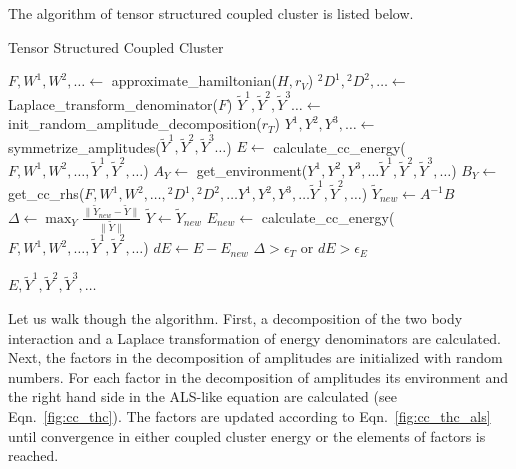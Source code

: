 The algorithm of tensor structured coupled cluster is listed below. 
%
\begin{algorithm}[H]
  \caption{Tensor Structured Coupled Cluster}\label{code:tcc_algorithm}
  \begin{algorithmic}[1] 
  \State $F, W^{1},W^{2},\ldots \gets$ approximate\_hamiltonian($H, r_{V}$)
  \State ${}^2D^1,{}^2D^{2},\ldots \gets$ 
Laplace\_transform\_denominator($F$)  
  \State $\tilde{Y}^1, \tilde{Y}^2, \tilde{Y}^3 \ldots \gets$ 
init\_random\_amplitude\_decomposition($r_{T}$) 
  \Repeat 
  \State $Y^1, Y^2, Y^3, \ldots \gets 
$ symmetrize\_amplitudes($\tilde{Y}^{1}, \tilde{Y}^{2}, \tilde{Y}^{3} \ldots$)
   \State $E \gets $ calculate\_cc\_energy($F, W^1, W^2, \ldots, 
\tilde{Y}^{1}, \tilde{Y}^{2}, \ldots$)
  \State $A_{Y} \gets $ get\_environment($Y^1, Y^2, Y^3, \ldots \tilde{Y}^1, 
\tilde{Y}^2, \tilde{Y}^3, \ldots$)
  \State $B_{Y} \gets $ get\_cc\_rhs($F, W^1, W^2, \ldots, {}^2D^{1}, 
{}^2D^{2}, \ldots Y^{1}, Y^{2}, Y^{3}, \ldots \tilde{Y}^{1}, \tilde{Y}^{2}, 
\ldots$) 
   \State $\tilde{Y}_{new} \gets A^{-1} B$
   \EndFor
   \State $\Delta \gets \max_{Y} \frac{\| \tilde{Y}_{new} - \tilde{Y} \|}{\|
\tilde{Y} \|}$
   \State $\tilde{Y} \gets \tilde{Y}_{new}$ 
   \State $E_{new} \gets $ calculate\_cc\_energy($F, W^1, W^2, \ldots, 
\tilde{Y}^{1}, \tilde{Y}^{2}, \ldots$)
   \State $dE \gets E - E_{new}$
   \Until $\Delta > \epsilon_{T}$ or $dE > \epsilon_{E}$ 
   
   \Return $E, \tilde{Y}^1, \tilde{Y}^2, \tilde{Y}^3, \ldots$
    \EndFunction
  \end{algorithmic}
\end{algorithm}
%
Let us walk though the algorithm. First, a 
decomposition of the two body interaction and a Laplace transformation of 
energy denominators are calculated. Next, the factors in the decomposition of 
amplitudes are initialized with random numbers. For each factor in the 
decomposition of amplitudes its environment and the right hand side in the 
ALS-like equation are calculated (see Eqn.~\ref{fig:cc_thc}). The factors  are 
updated according to Eqn.~\ref{fig:cc_thc_als} until convergence in either 
coupled cluster energy or the elements of factors is reached.


